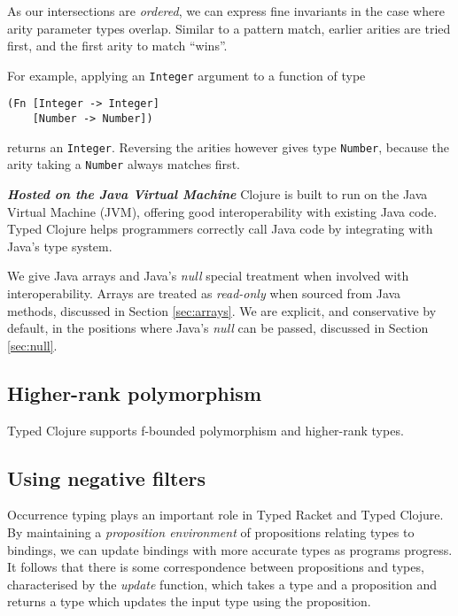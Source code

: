 \documentclass[preprint,10pt]{sigplanconf}
\newcommand\smallsection[1]{\bf \emph{#1}}
\begin{document}
As our intersections are \emph{ordered}, we can express fine invariants in the
case where arity parameter types overlap. Similar to a pattern match, earlier arities 
are tried first, and the first arity to match ``wins''.

For example, applying an \lstinline|Integer| argument to a function of type

\begin{lstlisting}[label=lst:ordered]
(Fn [Integer -> Integer]
    [Number -> Number])
\end{lstlisting}

returns an \lstinline|Integer|. Reversing the arities however gives
type \lstinline|Number|, because the arity taking a \lstinline|Number|
always matches first.

{\smallsection {Hosted on the Java Virtual Machine}}
Clojure is built to run on the Java Virtual Machine (JVM),
offering good interoperability with existing Java code.
Typed Clojure helps programmers correctly call Java code
by integrating with Java's type system.

We give Java arrays and Java's \emph{null} special treatment
when involved with interoperability. Arrays are treated as \emph{read-only}
when sourced from Java methods, discussed in Section \ref{sec:arrays}.
We are explicit, and conservative by default, in the positions where
Java's \emph{null} can be passed, discussed in Section \ref{sec:null}.


\subsection{Higher-rank polymorphism}

Typed Clojure supports f-bounded polymorphism and higher-rank
types.

\subsection{Using negative filters}

Occurrence typing plays an important role in Typed Racket and Typed Clojure.
By maintaining a \emph{proposition environment} of propositions relating types to
bindings, we can update bindings with more accurate types as programs progress.
It follows that there is some correspondence between propositions and types,
characterised by the \emph{update} function, which takes a type and a proposition
and returns a type which updates the input type using the proposition.
\end{document}
